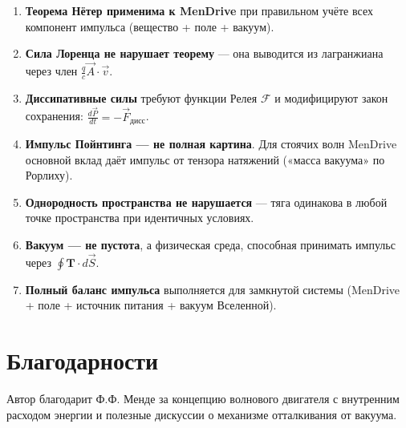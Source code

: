 \documentclass[a4paper,12pt]{article}
\begin{document}
\begin{enumerate}
    \item \textbf{Теорема Нётер применима к MenDrive} при правильном учёте
    всех компонент импульса (вещество + поле + вакуум).

    \item \textbf{Сила Лоренца не нарушает теорему} --- она выводится из
    лагранжиана через член $\frac{q}{c}\vec{A}\cdot\vec{v}$.

    \item \textbf{Диссипативные силы} требуют функции Релея $\mathcal{F}$ и
    модифицируют закон сохранения: $\frac{d\vec{P}}{dt} = -\vec{F}_{\text{дисс}}$.

    \item \textbf{Импульс Пойнтинга --- не полная картина}. Для стоячих
    волн MenDrive основной вклад даёт импульс от тензора натяжений
    («масса вакуума» по Рорлиху).

    \item \textbf{Однородность пространства не нарушается} --- тяга
    одинакова в любой точке пространства при идентичных условиях.

    \item \textbf{Вакуум --- не пустота}, а физическая среда, способная
    принимать импульс через $\oint\mathbf{T}\cdot d\vec{S}$.

    \item \textbf{Полный баланс импульса} выполняется для замкнутой системы
    (MenDrive + поле + источник питания + вакуум Вселенной).
\end{enumerate}

\section*{Благодарности}

Автор благодарит Ф.Ф. Менде за концепцию волнового двигателя с внутренним
расходом энергии и полезные дискуссии о механизме отталкивания от вакуума.
\end{document}
